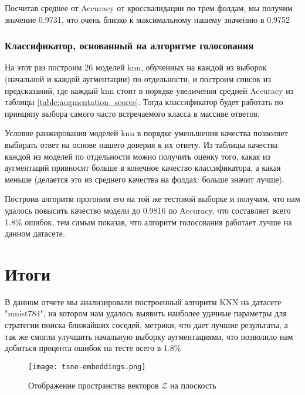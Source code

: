 \documentclass{article}
\begin{document}
            \begin{leftrule}
                Посчитав среднее от Accuracy от кроссвалидации по трем фолдам, мы получим значение 0.9731, что очень близко к максимальному нашему значению в  0.9752
            \end{leftrule}
        \subsubsection{Классификатор, основанный на алгоритме голосования}
            На этот раз построим 26 моделей knn, обученных на каждой из выборок (начальной и каждой аугментации) по отдельности, и построим список из предсказаний, где каждый knn стоит в порядке увеличения средней Accuracy из таблицы \ref{table:augmentation_scores}. Тогда классификатор будет работать по принципу выбора самого часто встречаемого класса в массиве ответов. 

            \begin{leftrule}
                Условие ранжирования моделей knn в порядке уменьшения качества позволяет выбирать ответ на основе нашего доверия к их ответу. Из таблицы качества каждой из моделей по отдельности можно получить оценку того, какая из аугментаций привносит больше в конечное качество классификатора, а какая меньше (делается это из среднего качества на фолдах: больше значит лучше).
            \end{leftrule}

            Построив алгоритм прогоним его на той же тестовой выборке и получим, что нам удалось повысить качество модели до 0.9816 по Accuracy, что составляет всего 1.8\% ошибок, тем самым показав, что алгоритм голосования работает лучше на данном датасете.


\section{Итоги}
    В данном отчете мы анализировали построенный алгоритм KNN на датасете "mnist784", на котором нам удалось выявить наиболее удачные параметры для стратегии поиска ближайших соседей, метрики, что дает лучшие результаты, а так же смогли улучшить начальную выборку аугментациями, что позволило нам добиться процента ошибок на тесте всего в 1.8\% 

\begin{figure}[h]
    \centering
    \texttt{[image: tsne-embeddings.png]}
    \caption{Отображение пространства векторов $\mathcal{Z}$ на плоскость}
    \label{fig:tsne-embeddings}
\end{figure}
\end{document}
